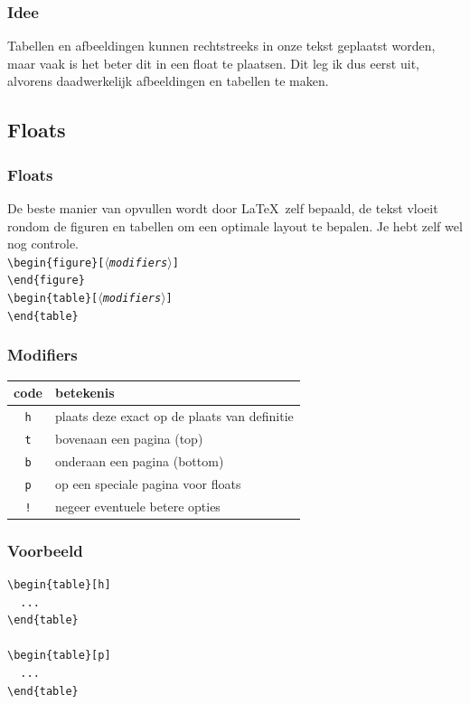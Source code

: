 \begin{frame}
  \frametitle{Idee}

  Tabellen en afbeeldingen kunnen rechtstreeks in onze tekst geplaatst worden, maar vaak is het beter dit in een float te plaatsen. Dit leg ik dus eerst uit, alvorens daadwerkelijk afbeeldingen en tabellen te maken.
\end{frame}

\subsection{Floats}
\begin{frame}
  \frametitle{Floats}

  De beste manier van opvullen wordt door \LaTeX\ zelf bepaald, de tekst vloeit rondom de figuren en tabellen om een optimale layout te bepalen. Je hebt zelf wel nog controle. \\[1em]

  \texttt{\textcolor{uagreen}{\textbackslash begin}\{figure\}[$\langle$\textsl{modifiers}$\rangle$]} \\
  \texttt{\textcolor{uagreen}{\textbackslash end}\{figure\}} \\[.5em]

  \texttt{\textcolor{uagreen}{\textbackslash begin}\{table\}[$\langle$\textsl{modifiers}$\rangle$]} \\
  \texttt{\textcolor{uagreen}{\textbackslash end}\{table\}}
\end{frame}

\begin{frame}
  \frametitle{Modifiers}

  \begin{tabular}{cl}
    code & betekenis \\\midrule
    \texttt{h} & plaats deze exact op de plaats van definitie \\
    \texttt{t} & bovenaan een pagina (top) \\
    \texttt{b} & onderaan een pagina (bottom) \\
    \texttt{p} & op een speciale pagina voor floats \\
    \texttt{!} & negeer eventuele betere opties
  \end{tabular}
\end{frame}

\begin{frame}[fragile]
  \frametitle{Voorbeeld}

  \begin{verbatim}
\begin{table}[h]
  ...
\end{table}

\begin{table}[p]
  ...
\end{table}
\end{verbatim}
\end{frame}

